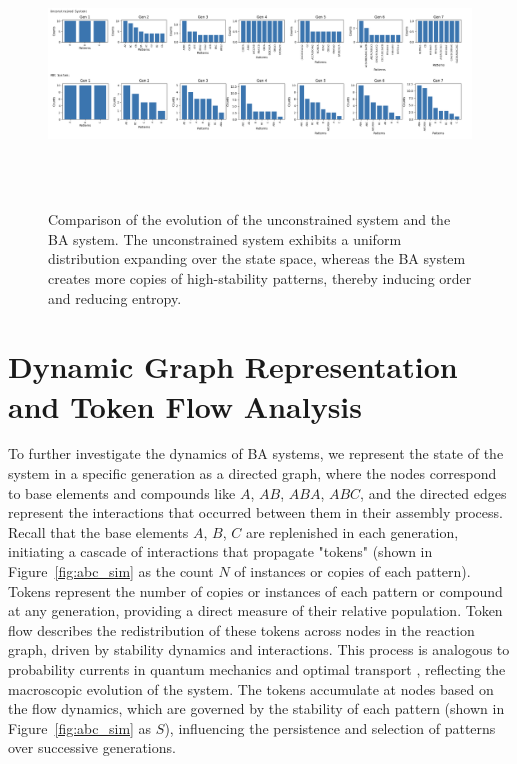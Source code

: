 \documentclass[entropy,article,submit,pdftex,moreauthors]{Definitions/mdpi}
\begin{document}
\begin{figure}[h]
    \centering
    \includegraphics[width=1\textwidth,height=7cm]{monte-carlo-fits.png}
    \caption{Comparison of the evolution of the unconstrained system and the BA system. 
    The unconstrained system exhibits a uniform distribution expanding over the state space, 
    whereas the BA system creates more copies of high-stability patterns, 
    thereby inducing order and reducing entropy.}
    \label{fig:simulation_results}
\end{figure}

\section{Dynamic Graph Representation and Token Flow Analysis}

To further investigate the dynamics of BA systems, we represent the state of the system in a specific generation as a directed graph, where the nodes correspond to base elements and compounds like $A$, $AB$, $ABA$, $ABC$, and the directed edges represent the interactions that occurred between them in their assembly process. Recall that the base elements $A$, $B$, $C$ are replenished in each generation, initiating a cascade of interactions that propagate "tokens" (shown in Figure~\ref{fig:abc_sim} as the count $N$ of instances or copies of each pattern). Tokens represent the number of copies or instances of each pattern or compound at any generation, providing a direct measure of their relative population. Token flow describes the redistribution of these tokens across nodes in the reaction graph, driven by stability dynamics and interactions. This process is analogous to probability currents in quantum mechanics \cite{feynman1965quantum} and optimal transport \cite{villani2008optimal}, reflecting the macroscopic evolution of the system. The tokens accumulate at nodes based on the flow dynamics, which are governed by the stability of each pattern (shown in Figure~\ref{fig:abc_sim} as $S$), influencing the persistence and selection of patterns over successive generations.
\end{document}
